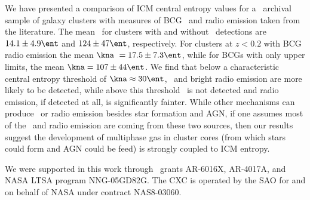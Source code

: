 \documentclass{emulateapj}
\begin{document}
We have presented a comparison of ICM central entropy values for a
\Chandra\ archival sample of galaxy clusters with measures of BCG
\halpha\ and radio emission taken from the literature. The mean
\kna\ for clusters with and without \halpha\ detections are $14.1 \pm
4.9 \ent$ and $124 \pm 47 \ent$, respectively. For clusters at $z <
0.2$ with BCG radio emission the mean $\kna\ = 17.5 \pm 7.3 \ent$,
while for BCGs with only upper limits, the mean $\kna = 107 \pm 44
\ent$. We find that below a characteristic central entropy threshold
of $\kna \approx 30 \ent$, \halpha\ and bright radio emission are more
likely to be detected, while above this threshold \halpha\ is not
detected and radio emission, if detected at all, is significantly
fainter. While other mechanisms can produce \halpha\ or radio emission
besides star formation and AGN, if one assumes most of the
\halpha\ and radio emission are coming from these two sources, then
our results suggest the development of multiphase gas in cluster cores
(from which stars could form and AGN could be feed) is strongly
coupled to ICM entropy.

\acknowledgements
We were supported in this work through \Chandra\ grants AR-6016X,
AR-4017A, and NASA LTSA program NNG-05GD82G. The CXC is operated by
the SAO for and on behalf of NASA under contract NAS8-03060.



\end{document}
